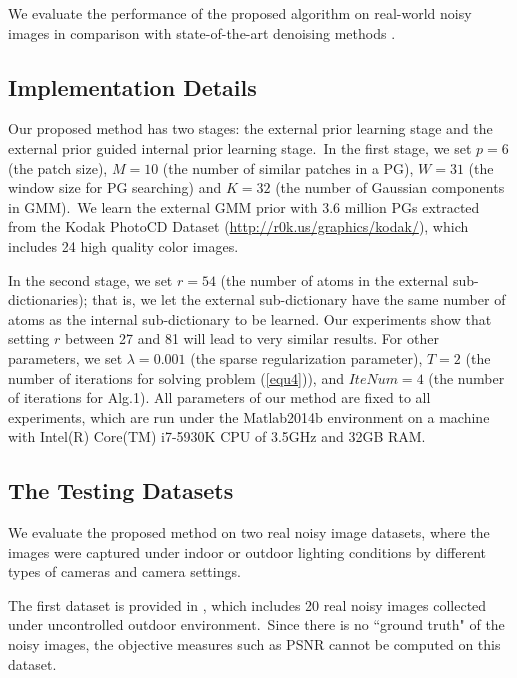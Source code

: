 \documentclass[10pt,twocolumn,letterpaper]{article}
\begin{document}
We evaluate the performance of the proposed algorithm on real-world noisy images \cite{crosschannel2016,ncwebsite}  in comparison with  state-of-the-art denoising methods \cite{bm3d,cbm3d,mlp,wnnm,csf,chen2015learning,crosschannel2016,noiseclinic,ncwebsite,neatimage}.


\subsection{Implementation Details}\vspace{-1mm}

Our proposed method has two stages: the external prior learning stage and the external prior guided internal prior learning stage.\ In the first stage, we set $p = 6$ (the patch size), $M = 10$ (the number of similar patches in a PG), $W = 31$ (the window size for PG searching) and $K = 32$ (the number of Gaussian components in GMM).\ We learn the external GMM prior with 3.6 million PGs extracted from the Kodak PhotoCD Dataset (\url{http://r0k.us/graphics/kodak/}), which includes 24 high quality color images. 

In the second stage, we set $r = 54$ (the number of atoms in the external sub-dictionaries); that is, we let the external sub-dictionary have the same number of atoms as the internal sub-dictionary to be learned. Our experiments show that setting $r$ between 27 and 81 will lead to very similar results. For other parameters, we set $\lambda=0.001$ (the sparse regularization parameter), $T = 2$ (the number of iterations for solving problem (\ref{equ4})), and $IteNum = 4$ (the number of iterations for Alg.1). All parameters of our method are fixed to all experiments, which are run under the Matlab2014b environment on a machine with Intel(R) Core(TM) i7-5930K CPU of 3.5GHz and 32GB RAM.


\subsection{The Testing Datasets}\vspace{-1mm}

We evaluate the proposed method on two real noisy image datasets, where the images were captured under indoor or outdoor lighting conditions by different types of cameras and camera settings. 

The first dataset is provided in \cite{ncwebsite}, which includes 20 real noisy images collected under uncontrolled outdoor environment.\ Since there is no ``ground truth" of the noisy images, the objective measures such as PSNR cannot be computed on this dataset. 
\end{document}
